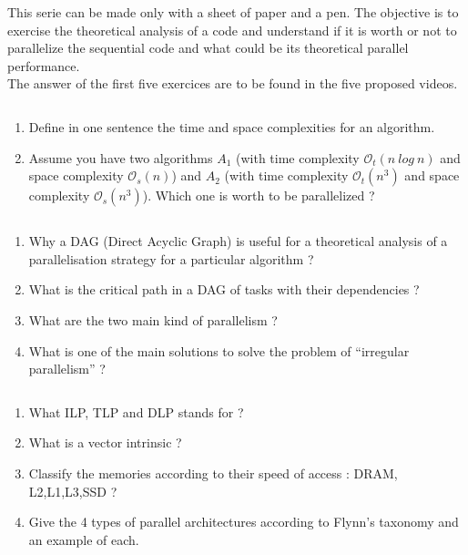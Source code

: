 \documentclass[11pt,a4paper]{article}
\begin{document}

\noindent
This serie can be made only with a sheet of paper and a pen. The objective is to exercise the theoretical analysis of a code and understand if it is worth or not to parallelize the sequential code and what could be its theoretical parallel performance.  
\\

The answer of the first five exercices are to be found in the five proposed videos.

\begin{exercise}
  $~$ %
\begin{enumerate}[label=(\alph*)]
	\item Define in one sentence the time and space complexities for an algorithm.

	\item Assume you have two algorithms $A_1$ (with time complexity $\mathcal{O}_t(n~log~n)$ and space complexity $\mathcal{O}_s(n)$) and $A_2$ (with time complexity $\mathcal{O}_t(n^3)$ and space complexity $\mathcal{O}_s(n^3)$). Which one is worth to be parallelized ?

\end{enumerate}
\end{exercise}



\begin{exercise}[Vocabulary]
  $~$ %
\begin{enumerate}[label=(\alph*)]
	\item Why a DAG (Direct Acyclic Graph) is useful for a theoretical analysis of a parallelisation strategy for a particular algorithm ?

	\item What is the critical path in a DAG of tasks with their dependencies ?

	\item What are the two main kind of parallelism  ?

	\item What is one of the main solutions to solve the problem of ``irregular parallelism'' ?

\end{enumerate}
\end{exercise}

\begin{exercise}
  $~$ %
\begin{enumerate}[label=(\alph*)]
	\item What ILP, TLP and DLP stands for ?

	\item What is a vector intrinsic ?

	\item Classify the memories according to their speed of access : DRAM, L2,L1,L3,SSD ?

	\item Give the 4 types of parallel architectures according to Flynn's taxonomy and an example of each.

\end{enumerate}
\end{exercise}
\end{document}
